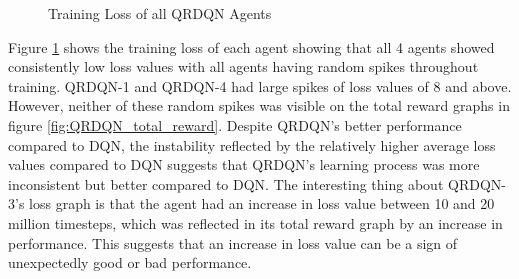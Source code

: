 \begin{figure}[H]
    \centering
    \caption{Training Loss of all QRDQN Agents}
    \label{fig:QRDQN_training_loss}
\end{figure}

Figure \ref{fig:QRDQN_training_loss} shows the training loss of each agent showing that all 4 agents showed consistently low loss values with all agents having random spikes throughout training. QRDQN-1 and QRDQN-4 had large spikes of loss values of 8 and above. However, neither of these random spikes was visible on the total reward graphs in figure \ref{fig:QRDQN_total_reward}. Despite QRDQN's better performance compared to DQN, the instability reflected by the relatively higher average loss values compared to DQN suggests that QRDQN's learning process was more inconsistent but better compared to DQN. The interesting thing about QRDQN-3's loss graph is that the agent had an increase in loss value between 10 and 20 million timesteps, which was reflected in its total reward graph by an increase in performance. This suggests that an increase in loss value can be a sign of unexpectedly good or bad performance.

